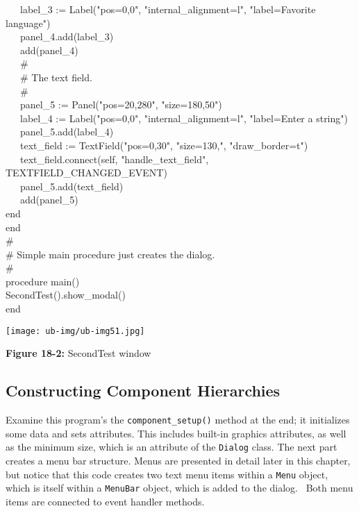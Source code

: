 {\>   \ \ \ label\_3 := Label("pos=0,0", "internal\_alignment=l",
"label=Favorite language") \\
\>   \ \ \ panel\_4.add(label\_3) \\
\>   \ \ \ add(panel\_4) \\
\>   \ \ \ \# \\
\>   \ \ \ \# The text field. \\
\>   \ \ \ \# \\
\>   \ \ \ panel\_5 := Panel("pos=20,280",
"size=180,50") \\
\>   \ \ \ label\_4 := Label("pos=0,0",
"internal\_alignment=l",
"label=Enter a string") \\
\>   \ \ \ panel\_5.add(label\_4) \\
\>   \ \ \ text\_field :=
TextField("pos=0,30",
"size=130,",
"draw\_border=t") \\
\>   \ \ \ text\_field.connect(self,
"handle\_text\_field",
TEXTFIELD\_CHANGED\_EVENT) \\
\>   \ \ \ panel\_5.add(text\_field) \\
\>   \ \ \ add(panel\_5) \\
\>   end \\
end \\
\# \\
\# Simple main procedure just creates the dialog. \\
\# \\
procedure main() \\
\>   SecondTest().show\_modal() \\
end
}


\begin{center}
\texttt{[image: ub-img/ub-img51.jpg]}
\end{center}

{\sffamily\bfseries Figure 18-2:}
{\sffamily SecondTest window}

\bigskip

\subsection*{Constructing Component Hierarchies}

Examine this program's the \texttt{component\_setup()}
method at the end; it initializes some data and
sets attributes. This includes built-in graphics attributes,
as well as the minimum size, which is an attribute of the
\texttt{Dialog} class.
The next part creates a menu bar structure.
Menus are presented in detail later in this chapter, but notice
that this code creates two text menu items within a
\texttt{Menu} object, which is itself within a \texttt{MenuBar} object,
which is added to the dialog. \ Both menu items are connected to event
handler methods.

